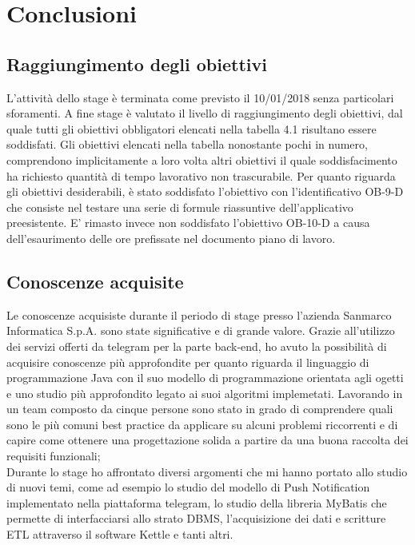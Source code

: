 
\chapter{Conclusioni}
\label{cap:conclusioni}


\section{Raggiungimento degli obiettivi}
L'attività dello stage è terminata come previsto il 10/01/2018 senza particolari sforamenti. 
A fine stage è valutato il livello di raggiungimento degli obiettivi, dal quale tutti gli obiettivi obbligatori elencati nella tabella
4.1 risultano essere soddisfati. Gli obiettivi elencati nella tabella nonostante pochi in numero, comprendono implicitamente a loro volta altri obiettivi il quale soddisfacimento ha richiesto quantità di tempo lavorativo non trascurabile. Per quanto riguarda gli obiettivi desiderabili, è stato soddisfato l'obiettivo con l'identificativo OB-9-D che consiste nel testare una serie di formule riassuntive dell'applicativo preesistente. E' rimasto invece non soddisfato l'obiettivo OB-10-D a causa dell'esaurimento delle ore prefissate nel documento piano di lavoro.

\section{Conoscenze acquisite}
Le conoscenze acquisiste durante il periodo di stage presso l'azienda Sanmarco Informatica S.p.A. sono state significative e di grande valore. Grazie all'utilizzo dei servizi offerti da telegram per la parte back-end, ho avuto la possibilità di acquisire conoscenze più approfondite per quanto riguarda il linguaggio di programmazione Java con il suo modello di programmazione orientata agli ogetti e uno studio più approfondito legato ai suoi algoritmi implemetati. Lavorando in un team composto da cinque persone sono stato in grado di comprendere quali sono le più comuni best practice da applicare su alcuni problemi riccorrenti e di capire  come ottenere una progettazione solida a partire da una buona raccolta dei requisiti funzionali; \\ Durante lo stage ho affrontato diversi argomenti che mi hanno portato allo studio di nuovi temi, come ad esempio lo studio del modello di Push Notification implementato nella piattaforma telegram, lo studio della libreria MyBatis che permette di interfacciarsi allo strato DBMS, l'acquisizione dei dati e scritture ETL attraverso il software Kettle e tanti altri. 

